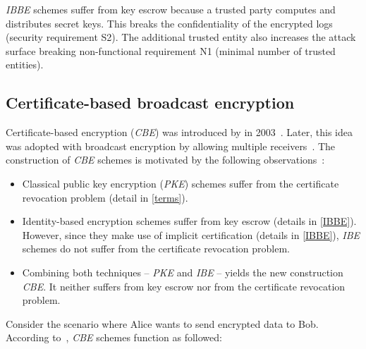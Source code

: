 \documentclass[../main.tex]{subfiles}
\begin{document}
\textit{IBBE} schemes suffer from key escrow because a trusted party computes and distributes secret keys.
This breaks the confidentiality of the encrypted logs (security requirement S2).
The additional trusted entity also increases the attack surface breaking non-functional requirement N1 (minimal number of trusted entities).

\subsection{Certificate-based broadcast encryption}
Certificate-based encryption (\textit{CBE}) was introduced by \citeauthor{Gentry2003} in 2003~\cite{Gentry2003}. 
Later, this idea was adopted with broadcast encryption by allowing multiple receivers~\cite{Li2018, Fan2013}.
The construction of \textit{CBE} schemes is motivated by the following observations~\cite{Gentry2003}:

\begin{itemize}
    \item Classical public key encryption (\textit{PKE}) schemes suffer from the certificate revocation problem (detail in \cref{terms}).
    \item Identity-based encryption schemes suffer from key escrow (details in \cref{IBBE}).
    However, since they make use of implicit certification (details in \cref{IBBE}), \textit{IBE} schemes do not suffer from the certificate revocation problem.
    \item Combining both techniques -- \textit{PKE} and \textit{IBE} -- yields the new construction \textit{CBE}. 
    It neither suffers from key escrow nor from the certificate revocation problem.
\end{itemize}

Consider the scenario where Alice wants to send encrypted data to Bob. 
According to~\cite{Gentry2003}, \textit{CBE} schemes function as followed:
\end{document}
